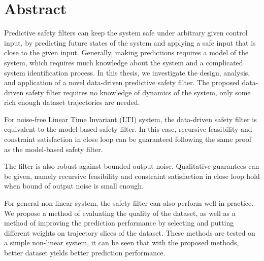 




 \setcounter{tocdepth}{2}
 \tableofcontents

 \cleardoublepage


\chapter*{Abstract}

Predictive safety filters can keep the system safe under arbitrary given control input, by predicting future states of the system and applying a safe input that is close to the given input.
Generally, making predictions requires a model of the system, which requires much knowledge about the system and a complicated system identification process.
In this thesis, we investigate the design, analysis, and application of a novel data-driven predictive safety filter.
The proposed data-driven safety filter requires no knowledge of dynamics of the system, only some rich enough dataset trajectories are needed.

For noise-free Linear Time Invariant (LTI) system, the data-driven safety filter is equivalent to the model-based safety filter.
In this case, recursive feasibility and constraint satisfaction in close loop can be guaranteed following the same proof as the model-based safety filter.

The filter is also robust against bounded output noise.
Qualitative guarantees can be given, namely recursive feasibility and constraint satisfaction in close loop hold when bound of output noise is small enough.

For general non-linear system, the safety filter can also perform well in practice.
We propose a method of evaluating the quality of the dataset, as well as a method of improving the prediction performance by selecting and putting different weights on trajectory slices of the dataset.
These methods are tested on a simple non-linear system, it can be seen that with the proposed methods, better dataset yields better prediction performance.

